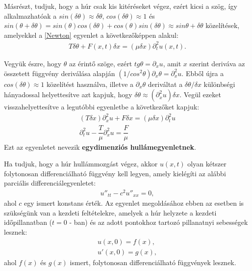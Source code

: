 Másrészt, tudjuk, hogy a húr csak kis kitéréseket végez, ezért kicsi a szög, így alkalmazhatóak a $ sin(\delta \theta) \approx \delta \theta$, $ cos(\delta \theta) \approx 1$ és \newline $ sin(\theta + \delta \theta) = sin(\theta) cos(\delta \theta) + cos(\theta) sin(\delta \theta) \approx sin \theta + \delta \theta$ közelítések, amelyekkel a \eqref{Newton} egyenlet a következőképpen alakul:
\begin{align} \label{eq:Newton}
	T \delta \theta + F(x,t) \delta x = (\mu \delta x) \partial^{2}_{t} u(x,t).
\end{align}

Vegyük észre, hogy $ \theta $ az érintő szöge, ezért $ tg \theta = \partial_{x} u$, amit $ x $ szerint deriváva az összetett függvény deriválása alapján $ (1/cos^{2} \theta) \partial_{x} \theta = \partial^{2}_{x} u $.
Ebből újra a $ cos(\delta \theta) \approx 1$ közelítést használva, illetve a $ \partial_{x} \theta $ deriváltat a $ \delta \theta / \delta x $ különbségi hányadossal helyettesítve azt kapjuk, hogy $ \delta \theta \approx  (\partial^{2}_{x} u) \delta x$. \newline Vegül ezeket visszahelyettesítve a legutóbbi egyenletbe a következőket kapjuk:
\begin{align} \label{eq:Newton}
	(T \delta x) \partial^{2}_{x} u + F \delta x = (\mu \delta x) \partial^{2}_{t} u \\
	\partial^{2}_{t} u - \dfrac{T}{\mu} \partial^{2}_{x} u = \dfrac{F}{\mu}
\end{align}
Ezt az egyenletet nevezik \textbf{egydimenziós hullámegyenletnek}.
\newline

Ha tudjuk, hogy a húr hullámmozgást végez, akkor $ u(x,t) $ olyan kétszer folytonosan differenciálható függvény kell legyen, amely kielégíti az alábbi parciális differenciálegyenletet:
\begin{align}
	u''_{tt} - c^{2}u''_{xx} = 0,
\end{align}
ahol $ c $ egy ismert konstans érték. Az egyenlet megoldásához ebben az esetben is szükségünk van a kezdeti feltételekre, amelyek a húr helyzete a kezdeti időpillanatban ($ t = 0 $ - ban) és az adott pontokhoz tartozó pillanatnyi sebességek lesznek:
\begin{align*}
	u(x,0) = f(x), \\
	u'(x,0) = g(x),
\end{align*}
ahol $ f(x) $ és $ g(x) $ ismert, folytonosan differenciálható függvények lesznek.
\\

